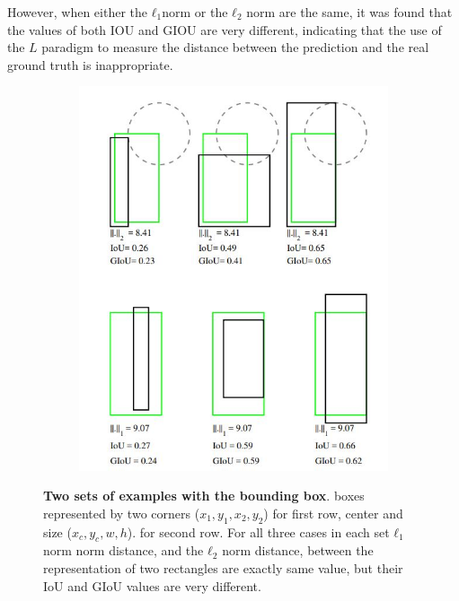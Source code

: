 However, when either the  $ ℓ_{1}$norm or the $ ℓ_{2}$ norm  are the same, it was found that the values of both IOU and GIOU are very different, indicating that the use of the $L$ paradigm to measure the distance between the prediction and the real ground truth is inappropriate.



\begin{figure}[h]
	\begin{center}
		\begin{subfigure}[b]{0.49\textwidth}
		    \centering
			\includegraphics[width=\textwidth]{thesis-template-master/images/l2loss.JPG}
			\label{fig:cellnet}
		\end{subfigure}
	\end{center}
	\caption{\textbf{Two sets of examples with the bounding box}.
boxes represented by two corners  ($x_{1}, y_{1}, x_{2}, y_{2}$)  for first row, center and size  ($x_{c}, y_{c}, w, h$). for second row. For all three cases in each set  $ ℓ_{1}$ norm
norm distance, and the $ ℓ_{2}$ norm distance, between the representation of two rectangles are exactly same value, but their IoU and GIoU values are very different.}
\end{figure}


